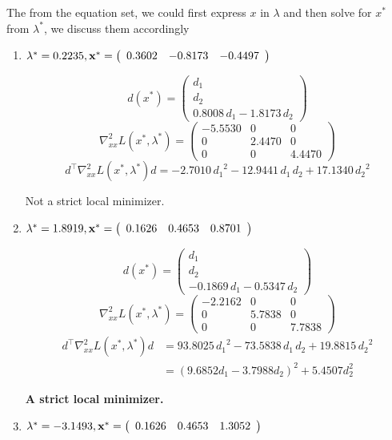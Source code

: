 The from the equation set, we could first express $x$ in $\lambda$ and then solve for $x^*$ from $\lambda^*$, we discuss them accordingly
\begin{enumerate}
\item $\lambda^* = 0.2235 , \mathbf{x^*} = \left(\begin{array}{ccc}
0.3602 & -0.8173 & -0.4497
\end{array}\right)$

\[
d(x^*) = \left(\begin{array}{c}
d_1 \\
d_2 \\
0.8008\,d_1 -1.8173\,d_2 
\end{array}\right)
\]
\[
\nabla^2_{xx}L(x^*, \lambda^*) = \left(\begin{array}{ccc}
-5.5530 & 0 & 0\\
0 & 2.4470 & 0\\
0 & 0 & 4.4470
\end{array}\right)
\]
\[
d^\intercal \nabla^2_{xx}L(x^*, \lambda^*) d = -2.7010\,{d_1 }^2 -12.9441\,d_1 \,d_2 +17.1340\,{d_2 }^2
\]

Not a strict local minimizer.

\item $\lambda^* = 1.8919 , \mathbf{x^*} =\left(\begin{array}{ccc}
0.1626 & 0.4653 & 0.8701
\end{array}\right)$


\[
d(x^*) = \left(\begin{array}{c}
d_1 \\
d_2 \\
-0.1869\,d_1 -0.5347\,d_2 
\end{array}\right)
\]
\[
\nabla^2_{xx}L(x^*, \lambda^*) = \left(\begin{array}{ccc}
-2.2162 & 0 & 0\\
0 & 5.7838 & 0\\
0 & 0 & 7.7838
\end{array}\right)
\]
\begin{align*}
d^\intercal \nabla^2_{xx}L(x^*, \lambda^*) d &= 93.8025\,{d_1 }^2 -73.5838\,d_1 \,d_2 +19.8815\,{d_2 }^2\\
&= (9.6852d_1 - 3.7988d_2)^2 + 5.4507d_2^2
\end{align*}

\textbf{A strict local minimizer.}

\item $\lambda^* = -3.1493 , \mathbf{x^*} =\left(\begin{array}{ccc}
0.1626 & 0.4653 & 1.3052
\end{array}\right)$


\end{enumerate}
